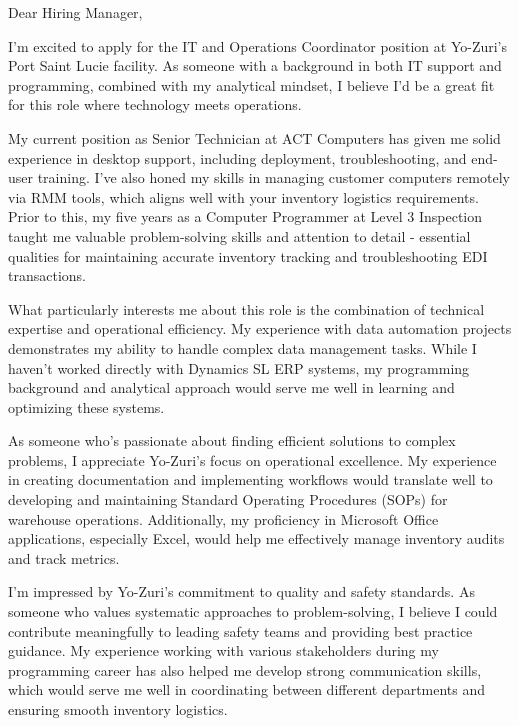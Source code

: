 
Dear Hiring Manager,

\smallskip

I'm excited to apply for the IT and Operations Coordinator position at Yo-Zuri's Port Saint Lucie facility.
As someone with a background in both IT support and programming, combined with my analytical mindset, I believe I'd be a great fit for this role where technology meets operations.

\smallskip

My current position as Senior Technician at ACT Computers has given me solid experience in desktop support, including deployment, troubleshooting, and end-user training.
I've also honed my skills in managing customer computers remotely via RMM tools, which aligns well with your inventory logistics requirements.
Prior to this, my five years as a Computer Programmer at Level 3 Inspection taught me valuable problem-solving skills and attention to detail - essential qualities for maintaining accurate inventory tracking and troubleshooting EDI transactions.

\smallskip

What particularly interests me about this role is the combination of technical expertise and operational efficiency.
My experience with data automation projects demonstrates my ability to handle complex data management tasks.
While I haven't worked directly with Dynamics SL ERP systems, my programming background and analytical approach would serve me well in learning and optimizing these systems.

\smallskip

As someone who's passionate about finding efficient solutions to complex problems, I appreciate Yo-Zuri's focus on operational excellence.
My experience in creating documentation and implementing workflows would translate well to developing and maintaining Standard Operating Procedures (SOPs) for warehouse operations.
Additionally, my proficiency in Microsoft Office applications, especially Excel, would help me effectively manage inventory audits and track metrics.

\smallskip

I'm impressed by Yo-Zuri's commitment to quality and safety standards.
As someone who values systematic approaches to problem-solving, I believe I could contribute meaningfully to leading safety teams and providing best practice guidance.
My experience working with various stakeholders during my programming career has also helped me develop strong communication skills, which would serve me well in coordinating between different departments and ensuring smooth inventory logistics.

